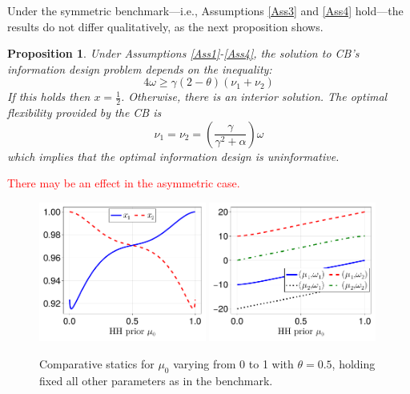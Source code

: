 \documentclass[12pt,a4paper]{article}
\newtheorem{proposition}{Proposition}
\begin{document}
Under the symmetric benchmark---i.e., Assumptions \ref{Ass3} and \ref{Ass4} hold---the results do not differ qualitatively, as the next proposition shows.

\begin{proposition}
    \label{Prop4}
    Under Assumptions \ref{Ass1}-\ref{Ass4}, the solution to CB's information design problem depends on the inequality:
    \begin{equation}
    \label{threshold2}
        4\omega\geq\gamma(2-\theta)(\nu_1+\nu_2)
    \end{equation}
    If this holds then $x=\frac{1}{2}$. Otherwise, there is an interior solution. 
    The optimal flexibility provided by the CB is
    \begin{equation}
        \nu_1=\nu_2=\left(\frac{\gamma}{\gamma^2+\alpha}\right)\omega
    \end{equation}
    which implies that the optimal information design is uninformative.
\end{proposition}

\textcolor{red}{There may be an effect in the asymmetric case.}

\begin{figure}[H]
\centering
\includegraphics[width=0.49\textwidth]{figures/V11/γ=10.0-μ_0=0.5-α=1.0-θ=0.5-δ=0.5-ω_1=1.0-ω_2=-1.0/communication/fig_optimal_x_by_μ_0.pdf}
\includegraphics[width=0.49\textwidth]{figures/V11/γ=10.0-μ_0=0.5-α=1.0-θ=0.5-δ=0.5-ω_1=1.0-ω_2=-1.0/communication/fig_optimal_γ_by_μ_0.pdf}
\caption{Comparative statics for $\mu_0$ varying from 0 to 1 with $\theta = 0.5$, holding fixed all other parameters as in the benchmark.}
\label{Figure7}
\end{figure}
\end{document}
